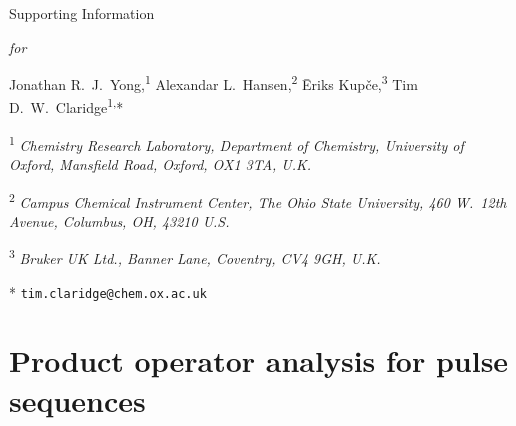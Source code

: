 \newcommand{\sectionbreak}{\clearpage}
\renewcommand*{\thefigure}{S\arabic{figure}}
\renewcommand*{\thetable}{S\arabic{table}}
\renewcommand*{\thepage}{S\arabic{page}}
\setcounter{page}{1}
\setcounter{figure}{0}
\setcounter{table}{0}
\onehalfspacing
\hspace{0pt}
\vfill
\begin{center}
    \huge
    Supporting Information

    \textit{for}

    \hsqctitle{}

    \vspace{1cm}

    \Large Jonathan R.\ J.\ Yong,\textsuperscript{1} Alexandar L.\ Hansen,\textsuperscript{2} {\=E}riks Kup{\v{c}}e,\textsuperscript{3} Tim D.\ W.\ Claridge\textsuperscript{1,}*

    \vspace{1cm}

    \large \textsuperscript{1} \textit{Chemistry Research Laboratory, Department of Chemistry, University of Oxford, Mansfield Road, Oxford, OX1 3TA, U.K.}

    \textsuperscript{2} \textit{Campus Chemical Instrument Center, The Ohio State University, 460 W.\ 12th Avenue, Columbus, OH, 43210 U.S.}

    \textsuperscript{3} \textit{Bruker UK Ltd., Banner Lane, Coventry, CV4 9GH, U.K.}

    * \texttt{tim.claridge@chem.ox.ac.uk}
\end{center}
\thispagestyle{empty}
\vfill
\hspace{0pt}
\newpage

\tableofcontents

\newpage

\section{Product operator analysis for pulse sequences}

